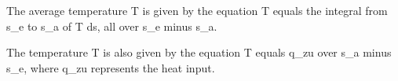 The average temperature T is given by the equation T equals the integral from s_e to s_a of T ds, all over s_e minus s_a.

The temperature T is also given by the equation T equals q_zu over s_a minus s_e, where q_zu represents the heat input.